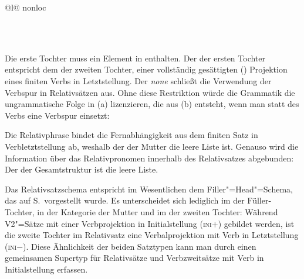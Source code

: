 \begin{samepage}
\begin{schema}
{{\begin{tabular}{@{}l@{}}
{                                                 nonloc  \\
                                               } \\
                            \end{tabular}
                         } \\
}%
\end{schema}
\end{samepage}
%
Die erste Tochter muss ein Element in \rel enthalten. Der \localw der ersten Tochter 
entspricht dem \slashw der zweiten Tochter, einer 
vollständig gesättigten (\comps \eliste) Projektion eines finiten Verbs in Letztstellung. Der \dslw
\emph{none} schließt die Verwendung der Verbspur in Relativsätzen aus. Ohne diese Restriktion würde
die Grammatik die ungrammatische Folge in (a) lizenzieren, die aus (b) entsteht, wenn
man statt des Verbs eine Verbspur einsetzt:
\eal
{}
\zl

\noindent
Die Relativphrase bindet die Fernabhängigkeit aus dem finiten Satz in Verbletztstellung ab,
weshalb der \slashw der Mutter die leere Liste ist. Genauso wird die Information über das
Relativpronomen innerhalb des Relativsatzes abgebunden: Der \relw der Gesamtstruktur ist die leere Liste. 

Das Relativsatzschema entspricht im Wesentlichen
dem Filler"=Head"=Schema, das auf S.\,\pageref{hf-schemaa} vorgestellt wurde. Es unterscheidet sich lediglich im
\relw der Füller-Tochter, in der Kategorie der Mutter und im \iniw der zweiten Tochter: Während V2"=Sätze mit einer
Verbprojektion in Initialstellung (\textsc{ini}$+$) gebildet werden, ist die zweite Tochter im
Relativsatz eine Verbalprojektion mit Verb in Letztstellung (\textsc{ini}$-$). Diese Ähnlichkeit der
beiden Satztypen kann man durch einen gemeinsamen Supertyp für Relativsätze und Verbzweitsätze mit
Verb in Initialstellung erfassen.


